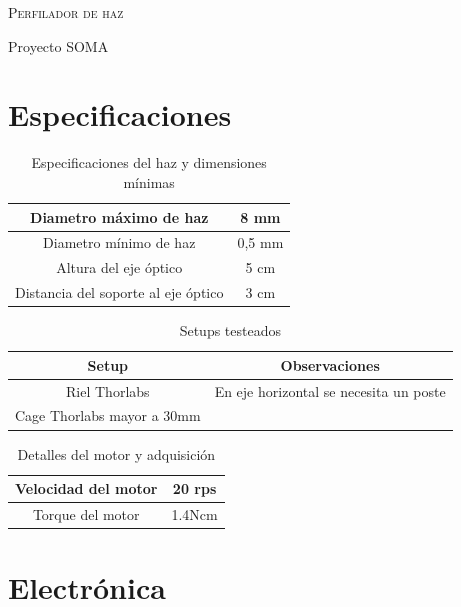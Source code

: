 \documentclass[12pt,a4paper]{article}
\begin{document}
{\scshape\Huge Perfilador de haz \par}

{\Large Proyecto SOMA \par}


\section{Especificaciones}

\begin{table}[H]
  \centering
  \begin{tabular}{|c|c|}
    \hline
    Diametro máximo de haz &  8 mm \\ \hline
    Diametro mínimo de haz &  0,5 mm\\ \hline
    Altura del eje óptico   &  5 cm\\ \hline
    Distancia del soporte al eje óptico &  3 cm\\ \hline
  \end{tabular}
  \caption{Especificaciones del haz y dimensiones mínimas}
  \label{tab:perfilador_mecanica}
\end{table}

\begin{table}[H]
  \centering
  \begin{tabular}{|c|c|}
    \hline
    Setup &  Observaciones \\ \hline
    Riel Thorlabs & \footnotesize En eje horizontal se necesita un poste \\ \hline
    Cage Thorlabs mayor a 30mm &   \\ \hline
  \end{tabular}
  \caption{Setups testeados}
  \label{tab:perfilador_setup}
\end{table}


\begin{table}[H]
  \centering
  \begin{tabular}{|c|c|}
    \hline
    Velocidad del motor &  20 rps \\ \hline
    Torque del motor    &  1.4Ncm \\ \hline
  \end{tabular}
  \caption{Detalles del motor y adquisición}
  \label{tab:electronica_adq}
\end{table}


\section{Electrónica}
\end{document}
